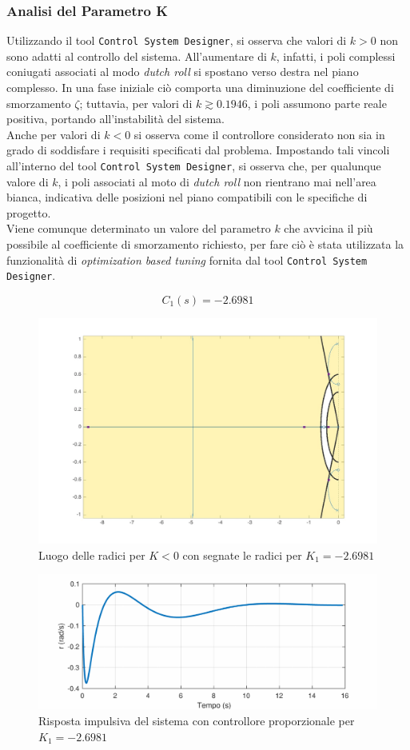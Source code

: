 \subsubsection{Analisi del Parametro K}
Utilizzando il tool \texttt{Control System Designer}, si osserva che valori di $k > 0$ non sono adatti al controllo del sistema.
All'aumentare di $k$, infatti, i poli complessi coniugati associati al modo \textit{dutch roll} si spostano verso destra nel piano complesso.
In una fase iniziale ciò comporta una diminuzione del coefficiente di smorzamento $\zeta$; tuttavia, per valori di $k \gtrsim 0.1946$, i poli assumono parte reale positiva, portando all'instabilità del sistema.
\\[10pt]
Anche per valori di $k < 0$ si osserva come il controllore considerato non sia in grado di soddisfare i requisiti specificati dal problema.
Impostando tali vincoli all'interno del tool \texttt{Control System Designer}, si osserva che, per qualunque valore di $k$, i poli associati al moto di \textit{dutch roll} non rientrano mai nell'area bianca, indicativa delle posizioni nel piano compatibili con le specifiche di progetto.
\\[10pt]
Viene comunque determinato un valore del parametro $k$ che avvicina il più possibile al coefficiente di smorzamento richiesto, per fare ciò è stata utilizzata la funzionalità di \textit{optimization based tuning} fornita dal tool \texttt{Control System Designer}.

\begin{equation*}
    C_1(s) = -2.6981
\end{equation*}

\begin{figure}[H]
    \centering
    \includegraphics[width=0.6\linewidth]{Immagini/root_proportional_lateral.pdf}
    \caption{Luogo delle radici per $K < 0$ con segnate le radici per $K_1 = -2.6981$}
\end{figure}

\begin{figure}[H]
    \centering
    \includegraphics[width=0.7\linewidth]{Immagini/proportional_impulse_lateral.pdf}
    \caption{Risposta impulsiva del sistema con controllore proporzionale per $K_1 = -2.6981$}
\end{figure}

